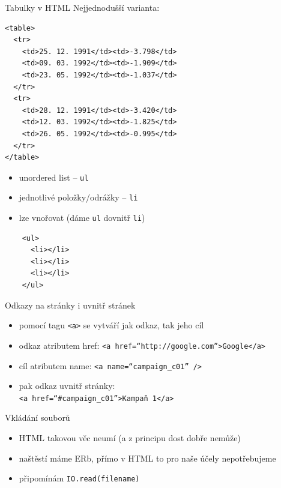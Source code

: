 \documentclass{beamer}
\begin{document}
\begin{frame}[fragile]{Tabulky v HTML}
  Nejjednodušší varianta:
  \scriptsize
  \begin{verbatim}
<table>
  <tr>
    <td>25. 12. 1991</td><td>-3.798</td>
    <td>09. 03. 1992</td><td>-1.909</td>
    <td>23. 05. 1992</td><td>-1.037</td>
  </tr>
  <tr>
    <td>28. 12. 1991</td><td>-3.420</td>
    <td>12. 03. 1992</td><td>-1.825</td>
    <td>26. 05. 1992</td><td>-0.995</td>
  </tr>
</table>
  \end{verbatim}
\end{frame}

\begin{frame}[fragile]{}
  \begin{itemize}
    \item unordered list -- \texttt{ul}
    \item jednotlivé položky/odrážky -- \texttt{li}
    \item lze vnořovat (dáme \texttt{ul} dovnitř \texttt{li})
  \end{itemize}
  \begin{verbatim}
    <ul>
      <li></li>
      <li></li>
      <li></li>
    </ul>
  \end{verbatim}
\end{frame}

\begin{frame}[fragile]{Odkazy na stránky i uvnitř stránek}
  \begin{itemize}
    \item pomocí tagu \texttt{<a>} se vytváří jak odkaz, tak jeho cíl
    \item odkaz atributem href: \texttt{<a href=``http://google.com''>Google</a>}
    \item cíl atributem name: \texttt{<a name=``campaign\_c01'' />}
    \item pak odkaz uvnitř stránky: \\ \texttt{<a href=``\#campaign\_c01''>Kampaň 1</a>}
  \end{itemize}
\end{frame}

\begin{frame}[fragile]{Vkládání souborů}
  \begin{itemize}
    \item HTML takovou věc neumí (a z principu dost dobře nemůže)
    \item naštěstí máme ERb, přímo v HTML to pro naše účely nepotřebujeme
    \item připomínám \texttt{IO.read(filename)}
  \end{itemize}
\end{frame}
\end{document}
